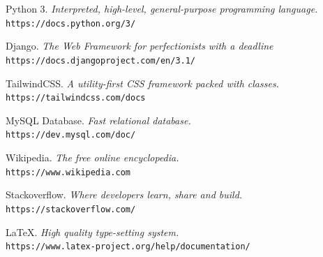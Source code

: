 \documentclass[12pt, a4paper]{report}
\begin{document}
  
  \newpage
  \begin{thebibliography}{7}
  Python 3. \textit{Interpreted, high-level, general-purpose programming language.}
  \\\texttt{https://docs.python.org/3/}
  
  Django. \textit{The Web Framework for perfectionists with a deadline}
  \\\texttt{https://docs.djangoproject.com/en/3.1/}
  
  TailwindCSS. \textit{A utility-first CSS framework packed with classes.}
  \\\texttt{https://tailwindcss.com/docs}
  
  MySQL Database. \textit{Fast relational database.}
  \\\texttt{https://dev.mysql.com/doc/}
  
  Wikipedia. \textit{The free online encyclopedia.}
  \\\texttt{https://www.wikipedia.com}
  
  Stackoverflow. \textit{Where developers learn, share and build.}
  \\\texttt{https://stackoverflow.com/}
  
  \LaTeX. \textit{High quality type-setting system.}
  \\\texttt{https://www.latex-project.org/help/documentation/}
  
  \end{thebibliography}
  
  
\end{document}

